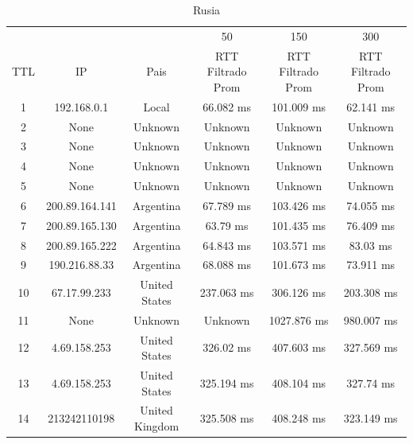 \begin{table}[]
\centering
\caption{Rusia}
\begin{tabular}{ | c | c | c | c | c | c | }
\hline
 & & & 50 & 150 & 300 \\ %
TTL	&         IP    &     	        Pais     &   	 RTT Filtrado Prom&  	 RTT Filtrado Prom&  	 RTT Filtrado Prom  \\ \hline
1	&192.168.0.1    &     	       Local     &   	      66.082 ms   &  	     101.009 ms   &  	      62.141 ms \\ \hline    
2	&None           &     	      Unknown    &   	      Unknown     &  	      Unknown     &  	      Unknown   \\ \hline    
3	&None           &     	      Unknown    &   	      Unknown     &  	      Unknown     &  	      Unknown   \\ \hline    
4	&None           &     	      Unknown    &   	      Unknown     &  	      Unknown     &  	      Unknown   \\ \hline    
5	&None           &     	      Unknown    &   	      Unknown     &  	      Unknown     &  	      Unknown   \\ \hline    
6	&200.89.164.141 &     	     Argentina   &   	      67.789 ms   &  	     103.426 ms   &  	      74.055 ms \\ \hline    
7	&200.89.165.130 &     	     Argentina   &   	       63.79 ms   &  	     101.435 ms   &  	      76.409 ms \\ \hline    
8	&200.89.165.222 &     	     Argentina   &   	      64.843 ms   &  	     103.571 ms   &  	       83.03 ms \\ \hline    
9	&190.216.88.33  &     	     Argentina   &   	      68.088 ms   &  	     101.673 ms   &  	      73.911 ms \\ \hline    
10	&67.17.99.233   &     	   United States &   	     237.063 ms   &  	     306.126 ms   &  	     203.308 ms \\ \hline    
11	&None           &     	      Unknown    &   	      Unknown     &  	    1027.876 ms   &  	     980.007 ms \\ \hline    
12	&4.69.158.253   &     	   United States &   	      326.02 ms   &  	     407.603 ms   &  	     327.569 ms \\ \hline    
13	&4.69.158.253   &     	   United States &   	     325.194 ms   &  	     408.104 ms   &  	      327.74 ms \\ \hline    
14	&213242110198	  & United Kingdom   	    & 325.508 ms     	     &408.248 ms     	     &323.149 ms     \\ \hline

\end{tabular}
\end{table}
